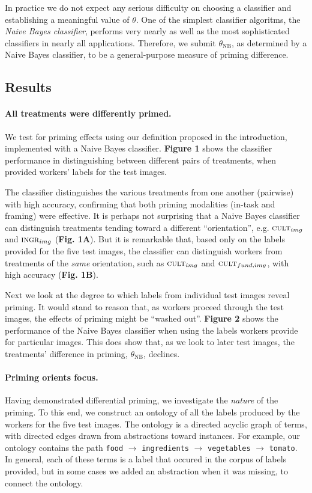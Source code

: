 \documentclass[a4paper]{report}
\begin{document}
In practice we do not expect any serious difficulty on choosing a classifier
and establishing a meaningful value of $\theta$.  One of the simplest 
classifier algoritms, the \textit{Naive Bayes classifier}, performs very 
nearly as well as the most sophisticated classifiers in nearly all 
applications.  Therefore, we submit $\theta_\text{NB}$, as determined by a 
Naive Bayes classifier, to be a general-purpose measure of priming difference.

\subsection*{Results}
\paragraph{All treatments were differently primed.}
We test for priming effects using our definition proposed in the introduction,
implemented with a Naive Bayes classifier.  \textbf{Figure 1} shows
the classifier performance in distinguishing between different pairs of 
treatments, when provided workers' labels for the test images.

The classifier distinguishes the various treatments from one another (pairwise)
with high accuracy, confirming that both priming modalities 
(in-task and framing) were effective.  It is perhaps not surprising that
a Naive Bayes classifier can distinguish treatments tending toward a different 
``orientation'', e.g. $\textsc{cult}_{img}$ and $\textsc{ingr}_{img}$
(\textbf{Fig. 1A}).
But it is remarkable that, based only on the labels provided for the five test 
images, the classifier can distinguish workers from treatments of the 
\textit{same} orientation, such as $\textsc{cult}_{img}$ and 
$\textsc{cult}_{fund, img}$, with high accuracy (\textbf{Fig. 1B}).

Next we look at the degree to which labels from individual test images reveal 
priming.  It would stand to reason that, as workers proceed through 
the test images, the effects of priming might be ``washed out''.  
\textbf{Figure 2} shows the
performance of the Naive Bayes classifier when using the labels workers provide
for particular images.  This does show that, as we look to later test images, 
the treatments' difference in priming, $\theta_\text{NB}$, declines.  

\paragraph{Priming orients focus.} Having demonstrated differential 
priming, we investigate the \textit{nature} of the priming.  To this
end, we construct an ontology of all the labels produced by the workers
for the five test images.  The ontology is a directed acyclic graph of terms,
with directed edges drawn from abstractions toward instances.  For example,
our ontology contains the path \texttt{food} $\to$ \texttt{ingredients} $\to$ 
\texttt{vegetables} 
$\to$ \texttt{tomato}.  In general, each of these terms is a label that
occured in the corpus of labels provided, but in some cases we added 
an abstraction when it was missing, to connect the ontology.
\end{document}
